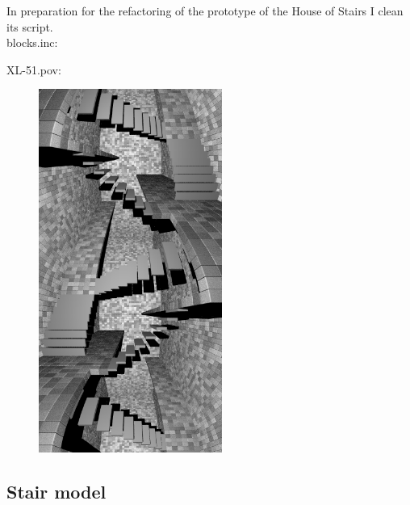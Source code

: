 \documentclass[12pt, a4paper]{article}
\begin{document}
In preparation for the refactoring of the prototype of the House of Stairs I clean its script.\\

blocks.inc:\\
\begin{scriptsize}
\begin{ttfamily}

\end{ttfamily}
\end{scriptsize}

XL-51.pov:\\
\begin{scriptsize}
\begin{ttfamily}

\end{ttfamily}
\end{scriptsize}

\begin{center}
\begin{figure}[H]
\centering
\includegraphics[width=6cm]{./clean_prototype.png}\\
\end{figure}
\end{center}

\subsection{Stair model}
\end{document}

